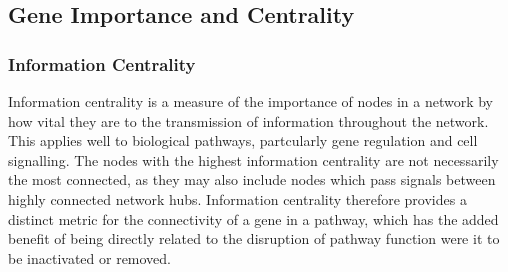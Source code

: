 \begin{table*}[!htb]
\caption{\gls{ANOVA} for Synthetic Lethality and Vertex Degree}
\label{tab:SL_Pathway_PI3K_Vertex_Degree}
\noindent{}
\end{table*}

\FloatBarrier

\subsection{Gene Importance and Centrality}  \label{chapt4:Network_Centrality}

\subsubsection{Information Centrality}  \label{chapt4:Network_InfoCent}

Information centrality is a measure of the importance of nodes in a network by how vital they are to the transmission of information throughout the network. This applies well to biological pathways, partcularly gene regulation and cell signalling. The nodes with the highest information centrality are not necessarily the most connected, as they may also include nodes which pass signals between highly connected network hubs. Information centrality therefore provides a distinct metric for the connectivity of a gene in a pathway, which has the added benefit of being directly related to the disruption of pathway function were it to be inactivated or removed.

